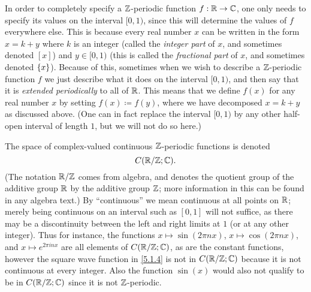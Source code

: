 \begin{note}
  In order to completely specify a \(\mathbb{Z}\)-periodic function \(f : \mathbb{R} \to \mathbb{C}\), one only needs to specify its values on the interval \([0, 1)\), since this will determine the values of \(f\) everywhere else.
  This is because every real number \(x\) can be written in the form \(x = k + y\) where \(k\) is an integer (called the \emph{integer part} of \(x\), and sometimes denoted \([x]\)) and \(y \in [0, 1)\) (this is called the \emph{fractional part} of \(x\), and sometimes denoted \(\left\lbrace x\right\rbrace\)).
  Because of this, sometimes when we wish to describe a \(\mathbb{Z}\)-periodic function \(f\) we just describe what it does on the interval \([0, 1)\), and then say that it is \emph{extended periodically} to all of \(\mathbb{R}\).
  This means that we define \(f(x)\) for any real number \(x\) by setting \(f(x) \coloneqq f(y)\), where we have decomposed \(x = k + y\) as discussed above.
  (One can in fact replace the interval \([0, 1)\) by any other half-open interval of length \(1\), but we will not do so here.)
\end{note}

\begin{note}
  The space of complex-valued continuous \(\mathbb{Z}\)-periodic functions is denoted
  \[
    C(\mathbb{R} / \mathbb{Z} ; \mathbb{C}).
  \]
  (The notation \(\mathbb{R} / \mathbb{Z}\) comes from algebra, and denotes the quotient group of the additive group \(\mathbb{R}\) by the additive group \(\mathbb{Z}\);
  more information in this can be found in any algebra text.)
  By ``continuous'' we mean continuous at all points on \(\mathbb{R}\);
  merely being continuous on an interval such as \([0, 1]\) will not suffice, as there may be a discontinuity between the left and right limits at \(1\) (or at any other integer).
  Thus for instance, the functions \(x \mapsto \sin(2 \pi n x)\), \(x \mapsto \cos(2 \pi n x)\), and \(x \mapsto e^{2 \pi i n x}\) are all elements of \(C(\mathbb{R} / \mathbb{Z} ; \mathbb{C})\), as are the constant functions, however the square wave function in \cref{5.1.4} is not in \(C(\mathbb{R} / \mathbb{Z} ; \mathbb{C})\) because it is not continuous at every integer.
  Also the function \(\sin(x)\) would also not qualify to be in \(C(\mathbb{R} / \mathbb{Z} ; \mathbb{C})\) since it is not \(\mathbb{Z}\)-periodic.
\end{note}

